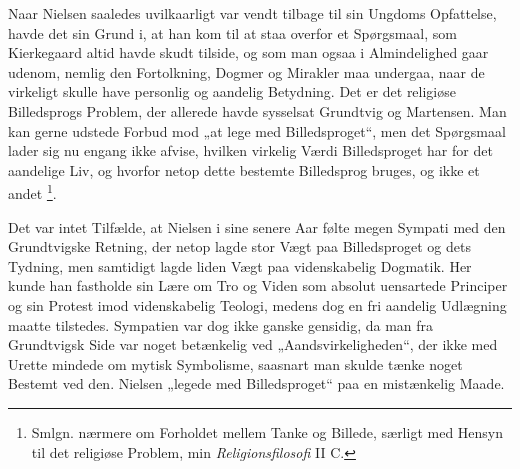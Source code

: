 \documentclass[12pt,a4paper,openany]{book}
\newcommand{\opage}[1]{\marginnote{\footnotesize\textit{[#1]}}}
\begin{document}
Naar Nielsen saaledes uvilkaarligt var vendt tilbage til sin Ungdoms
Opfattelse, havde det sin Grund i, at han kom til at
\setcounter{footnote}{0}%
\opage{194}staa overfor et Spørgsmaal, som Kierkegaard altid havde skudt
tilside, og som man ogsaa i Almindelighed gaar udenom, nemlig den Fortolkning,
Dogmer og Mirakler maa undergaa, naar de virkeligt skulle have personlig og
aandelig Betydning. Det er det religiøse Billedsprogs Problem, der allerede
havde sysselsat Grundtvig og Martensen. Man kan gerne udstede Forbud mod „at
lege med Billedsproget“, men det Spørgsmaal lader sig nu engang ikke afvise,
hvilken virkelig Værdi Billedsproget har for det aandelige Liv, og hvorfor
netop dette bestemte Billedsprog bruges, og ikke et andet%
\footnote[1]{Smlgn. nærmere om Forholdet mellem Tanke og Billede, særligt med
Hensyn til det religiøse Problem, min \textit{Religionsfilosofi} II C.}.

Det var intet Tilfælde, at Nielsen i sine senere Aar følte megen Sympati med
den Grundtvigske Retning, der netop lagde stor Vægt paa Billedsproget og dets
Tydning, men samtidigt lagde liden Vægt paa videnskabelig Dogmatik. Her kunde
han fastholde sin Lære om Tro og Viden som absolut uensartede Principer og sin
Protest imod videnskabelig Teologi, medens dog en fri aandelig Udlægning maatte
tilstedes. Sympatien var dog ikke ganske gensidig, da man fra Grundtvigsk Side
var noget betænkelig ved „Aandsvirkeligheden“, der ikke med Urette mindede om
mytisk Symbolisme, saasnart man skulde tænke noget Bestemt ved den. Nielsen
„legede med Billedsproget“ paa en mistænkelig Maade.
\end{document}
